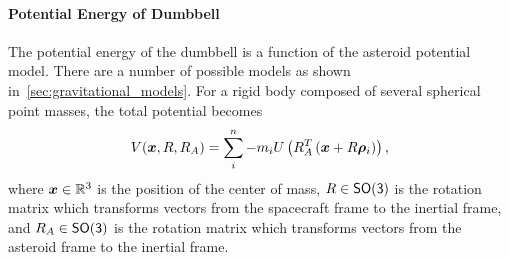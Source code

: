 \paragraph{Potential Energy of Dumbbell}
The potential energy of the dumbbell is a function of the asteroid potential model.
There are a number of possible models as shown in~\cref{sec:gravitational_models}.
For a rigid body composed of several spherical point masses, the total potential becomes
\begin{align}\label{eq:inertial_potential_energy}
    V(\bm{x}, R, R_A) = \sum_{i}^n - m_i U \left( R_A^T \left( \bm{x} + R \bm{\rho}_i \right) \right),
\end{align}
where \( \bm{x} \in \mathbb{R}^3\) is the position of the center of mass, \( R \in \mathsf{SO(3)}\) is the rotation matrix which transforms vectors from the spacecraft frame to the inertial frame, and \( R_A \in \mathsf{SO(3)} \) is the rotation matrix which transforms vectors from the asteroid frame to the inertial frame.

